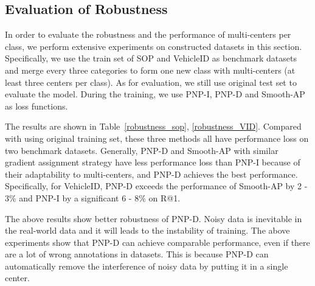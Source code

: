 \subsection{Evaluation of Robustness}

\noindent In order to evaluate the robustness and the performance of multi-centers per class, we perform extensive experiments on constructed datasets in this section. Specifically, we use the train set of SOP and VehicleID as benchmark datasets and merge every three categories to form one new class with multi-centers (at least three centers per class). As for evaluation, we still use original test set to evaluate the model. During the training, we use PNP-I, PNP-D and Smooth-AP as loss functions. 




The results are shown in Table~\ref{robustness_sop}, \ref{robustness_VID}. Compared with using original training set, these three methods all have performance loss on two benchmark datasets. Generally, PNP-D and Smooth-AP with similar gradient assignment strategy have less performance loss than PNP-I because of their adaptability to multi-centers, and PNP-D achieves the best performance. Specifically, for VehicleID, PNP-D exceeds the performance of Smooth-AP by 2 - 3\% and PNP-I by a significant 6 - 8\% on R@1. 


The above results show better robustness of PNP-D. Noisy data is inevitable in the real-world data and it will leads to the instability of training. The above experiments show that PNP-D can achieve comparable performance, even if there are a lot of wrong annotations in datasets. This is because PNP-D can automatically remove the interference of noisy data by putting it in a single center.



